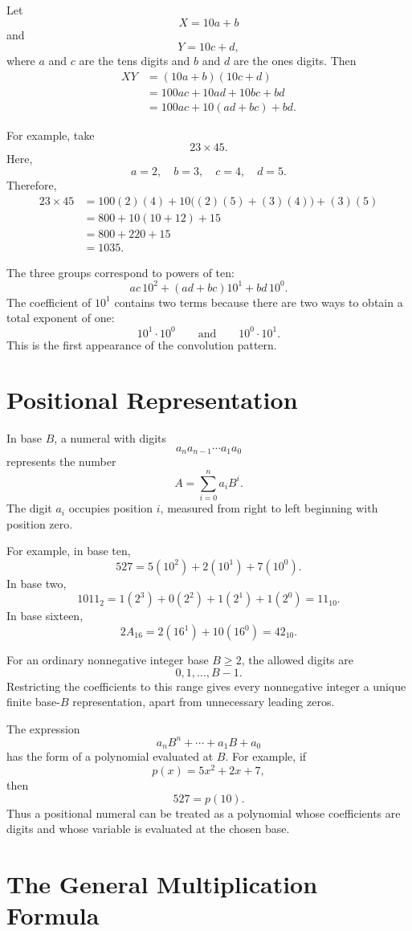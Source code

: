 \documentclass[11pt]{article}
\begin{document}
Let
\[
X=10a+b
\]
and
\[
Y=10c+d,
\]
where $a$ and $c$ are the tens digits and $b$ and $d$ are the ones digits. Then
\begin{align*}
XY
&=(10a+b)(10c+d)\\
&=100ac+10ad+10bc+bd\\
&=100ac+10(ad+bc)+bd.
\end{align*}

For example, take
\[
23\times45.
\]
Here,
\[
a=2,\quad b=3,\quad c=4,\quad d=5.
\]
Therefore,
\begin{align*}
23\times45
&=100(2)(4)+10\bigl((2)(5)+(3)(4)\bigr)+(3)(5)\\
&=800+10(10+12)+15\\
&=800+220+15\\
&=1035.
\end{align*}

The three groups correspond to powers of ten:
\[
ac\,10^2+(ad+bc)10^1+bd\,10^0.
\]
The coefficient of $10^1$ contains two terms because there are two ways to obtain a total exponent of one:
\[
10^1\cdot10^0
\qquad\text{and}\qquad
10^0\cdot10^1.
\]
This is the first appearance of the convolution pattern.

\section{Positional Representation}

In base $B$, a numeral with digits
\[
a_na_{n-1}\cdots a_1a_0
\]
represents the number
\[
\boxed{A=\sum_{i=0}^{n}a_iB^i}.
\]
The digit $a_i$ occupies position $i$, measured from right to left beginning with position zero.

For example, in base ten,
\[
527=5(10^2)+2(10^1)+7(10^0).
\]
In base two,
\[
1011_2=1(2^3)+0(2^2)+1(2^1)+1(2^0)=11_{10}.
\]
In base sixteen,
\[
2A_{16}=2(16^1)+10(16^0)=42_{10}.
\]

For an ordinary nonnegative integer base $B\ge 2$, the allowed digits are
\[
0,1,\ldots,B-1.
\]
Restricting the coefficients to this range gives every nonnegative integer a unique finite base-$B$ representation, apart from unnecessary leading zeros.

The expression
\[
a_nB^n+\cdots+a_1B+a_0
\]
has the form of a polynomial evaluated at $B$. For example, if
\[
p(x)=5x^2+2x+7,
\]
then
\[
527=p(10).
\]
Thus a positional numeral can be treated as a polynomial whose coefficients are digits and whose variable is evaluated at the chosen base.

\section{The General Multiplication Formula}
\end{document}
